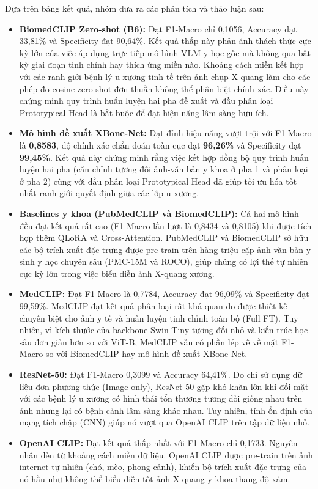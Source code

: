 Dựa trên bảng kết quả, nhóm đưa ra các phân tích và thảo luận sau:
\begin{itemize}
    \item \textbf{BiomedCLIP Zero-shot (B6):} Đạt F1-Macro chỉ 0,1056, Accuracy đạt 33,81\% và Specificity đạt 90,64\%. Kết quả thấp này phản ánh thách thức cực kỳ lớn của việc áp dụng trực tiếp mô hình VLM y học gốc mà không qua bất kỳ giai đoạn tinh chỉnh hay thích ứng miền nào. Khoảng cách miền kết hợp với các ranh giới bệnh lý u xương tinh tế trên ảnh chụp X-quang làm cho các phép đo cosine zero-shot đơn thuần không thể phân biệt chính xác. Điều này chứng minh quy trình huấn luyện hai pha đề xuất và đầu phân loại Prototypical Head là bắt buộc để đạt hiệu năng lâm sàng hữu ích.
    \item \textbf{Mô hình đề xuất XBone-Net:} Đạt đỉnh hiệu năng vượt trội với F1-Macro là \textbf{0,8583}, độ chính xác chẩn đoán toàn cục đạt \textbf{96,26\%} và Specificity đạt \textbf{99,45\%}. Kết quả này chứng minh rằng việc kết hợp đồng bộ quy trình huấn luyện hai pha (căn chỉnh tương đối ảnh-văn bản y khoa ở pha 1 và phân loại ở pha 2) cùng với đầu phân loại Prototypical Head đã giúp tối ưu hóa tốt nhất ranh giới quyết định giữa các lớp u xương.
    \item \textbf{Baselines y khoa (PubMedCLIP và BiomedCLIP):} Cả hai mô hình đều đạt kết quả rất cao (F1-Macro lần lượt là 0,8434 và 0,8105) khi được tích hợp thêm QLoRA và Cross-Attention. PubMedCLIP và BiomedCLIP sở hữu các bộ trích xuất đặc trưng được pre-train trên hàng triệu cặp ảnh-văn bản y sinh y học chuyên sâu (PMC-15M và ROCO), giúp chúng có lợi thế tự nhiên cực kỳ lớn trong việc biểu diễn ảnh X-quang xương.
    \item \textbf{MedCLIP:} Đạt F1-Macro là 0,7784, Accuracy đạt 96,09\% và Specificity đạt 99,59\%. MedCLIP đạt kết quả phân loại rất khả quan do được thiết kế chuyên biệt cho ảnh y tế và huấn luyện tinh chỉnh toàn bộ (Full FT). Tuy nhiên, vì kích thước của backbone Swin-Tiny tương đối nhỏ và kiến trúc học sâu đơn giản hơn so với ViT-B, MedCLIP vẫn có phần lép vế về mặt F1-Macro so với BiomedCLIP hay mô hình đề xuất XBone-Net.
    \item \textbf{ResNet-50:} Đạt F1-Macro 0,3099 và Accuracy 64,41\%. Do chỉ sử dụng dữ liệu đơn phương thức (Image-only), ResNet-50 gặp khó khăn lớn khi đối mặt với các bệnh lý u xương có hình thái tổn thương tương đối giống nhau trên ảnh nhưng lại có bệnh cảnh lâm sàng khác nhau. Tuy nhiên, tính ổn định của mạng tích chập (CNN) giúp nó vượt qua OpenAI CLIP trên tập dữ liệu nhỏ.
    \item \textbf{OpenAI CLIP:} Đạt kết quả thấp nhất với F1-Macro chỉ 0,1733. Nguyên nhân đến từ khoảng cách miền dữ liệu. OpenAI CLIP được pre-train trên ảnh internet tự nhiên (chó, mèo, phong cảnh), khiến bộ trích xuất đặc trưng của nó hầu như không thể biểu diễn tốt ảnh X-quang y khoa thang độ xám.
\end{itemize}

